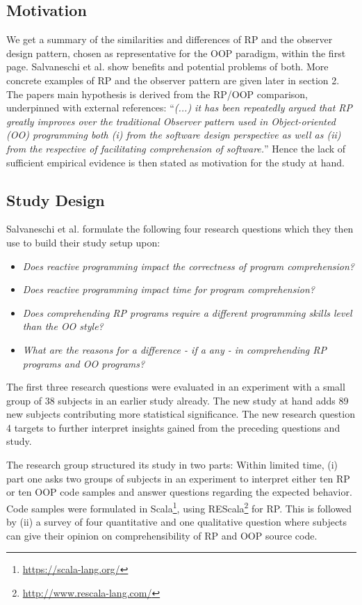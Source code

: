 \documentclass[12pt,a4paper]{article}
\begin{document}
\subsection{Motivation}
We get a summary of the similarities and differences of RP and the observer design pattern, chosen as representative for the OOP paradigm, within the first page. Salvaneschi et al. show benefits and potential problems of both. More concrete examples of RP and the observer pattern are given later in section 2. The papers main hypothesis is derived from the RP/OOP comparison, underpinned with external references: ``\emph{(...) it has been repeatedly argued that RP greatly improves over the traditional Observer pattern used in Object-oriented (OO) programming both (i) from the software design perspective as well as (ii) from the respective of facilitating comprehension of software.}'' Hence the lack of sufficient empirical evidence is then stated as motivation for the study at hand.

\subsection{Study Design}
Salvaneschi et al. formulate the following four research questions which they then use to build their study setup upon:

\begin{itemize}
	\item \emph{Does reactive programming impact the correctness of program comprehension?}
	\item \emph{Does reactive programming impact time for program comprehension?}
	\item \emph{Does comprehending RP programs require a different programming skills level than the OO style?}
	\item \emph{What are the reasons for a difference - if a any - in comprehending RP programs and OO programs?}
\end{itemize}

The first three research questions were evaluated in an experiment with a small group of 38 subjects in an earlier study \cite{Salvaneschi:2014:ESP:2635868.2635895} already. The new study at hand adds 89 new subjects contributing more statistical significance. The new research question 4 targets to further interpret insights gained from the preceding questions and study.

The research group structured its study in two parts: Within limited time, (i) part one asks two groups of subjects in an experiment to interpret either ten RP or ten OOP code samples and answer questions regarding the expected behavior. Code samples were formulated in Scala\footnote{\url{https://scala-lang.org/}}, using REScala\footnote{\url{http://www.rescala-lang.com/}} for RP. This is followed by (ii) a survey of four quantitative and one qualitative question where subjects can give their opinion on comprehensibility of RP and OOP source code.
\end{document}
